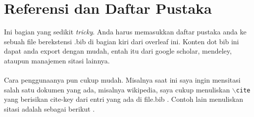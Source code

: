 \documentclass[11pt,a4paper]{article}
\begin{document}
\section{Referensi dan Daftar Pustaka}
Ini bagian yang sedikit \textit{tricky}. Anda harus memasukkan daftar pustaka anda ke sebuah file berekstensi .bib di bagian kiri dari overleaf ini. Konten dot bib ini dapat anda export dengan mudah, entah itu dari google scholar, mendeley, ataupun manajemen sitasi lainnya.\\\\
Cara penggunaanya pun cukup mudah. Misalnya saat ini saya ingin mensitasi salah satu dokumen yang ada, misalnya wikipedia, saya cukup menuliskan $\backslash${\tt{cite}} yang berisikan cite-key dari entri yang ada di file.bib \cite{Wikipedia_contributors2021-bb}. Contoh lain menuliskan sitasi adalah sebagai berikut \cite{Name2018-hd}.

\newpage


\end{document}
